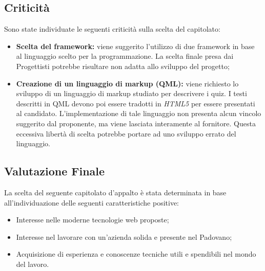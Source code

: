 \subsection{Criticità}
Sono state individuate le seguenti criticità sulla scelta del capitolato:
\begin{itemize}
\item \textbf{Scelta del framework:} viene suggerito l’utilizzo di due framework in base al linguaggio scelto per la programmazione. La scelta finale presa dai Progettisti potrebbe risultare non adatta allo sviluppo del progetto;
\item \textbf{Creazione di un linguaggio di markup (QML):} viene richiesto lo sviluppo di un linguaggio di markup studiato per descrivere i quiz. I testi descritti in QML devono poi essere tradotti in \textit{HTML5} per essere presentati al candidato. L’implementazione di tale linguaggio non presenta alcun vincolo suggerito dal proponente, ma viene lasciata interamente al fornitore. Questa eccessiva libertà di scelta potrebbe portare ad uno sviluppo errato del linguaggio.
\end{itemize}

\subsection{Valutazione Finale}
La scelta del seguente capitolato d’appalto è stata determinata in base all’individuazione delle seguenti caratteristiche positive:
\begin{itemize} 
\item Interesse nelle moderne tecnologie web proposte;
\item Interesse nel lavorare con un'azienda solida e presente nel Padovano;
\item Acquisizione di esperienza e conoscenze tecniche utili e spendibili nel mondo del lavoro.
\end{itemize}
